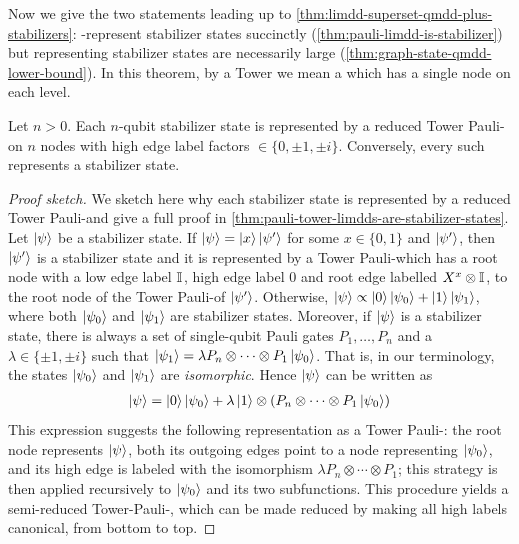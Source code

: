 Now we give the two statements leading up to \autoref{thm:limdd-superset-qmdd-plus-stabilizers}: \pauli-\limdds represent stabilizer states succinctly (\autoref{thm:pauli-limdd-is-stabilizer}) but \qmdds representing stabilizer states are necessarily large (\autoref{thm:graph-state-qmdd-lower-bound}).
In this theorem, by a Tower \limdd we mean a \limdd which has a single node on each level.

\begin{theorem}
	\label{thm:pauli-limdd-is-stabilizer}
    Let $n>0$.
    Each $n$-qubit stabilizer state is represented by a reduced Tower Pauli-\limdd on $n$ nodes with high edge label factors $\in \{0, \pm 1, \pm i\}$.
	Conversely, every such \limdd represents a stabilizer state.
\end{theorem}
\begin{proof}[Proof sketch]
    We sketch here why each stabilizer state is represented by a reduced Tower Pauli-\limdd and give a full proof in \autoref{thm:pauli-tower-limdds-are-stabilizer-states}.
    Let $\ket{\psi}$ be a stabilizer state.
    If $\ket{\psi} = \ket{x}\ket{\psi'}$ for some $x\in \{0, 1\}$ and $\ket{\psi'}$, then $\ket{\psi'}$ is a stabilizer state and it is represented by a Tower Pauli-\limdd which has a root node with a low edge label $\mathbb{I}_{}$, high edge label $0$ and root edge labelled $X^x \otimes \mathbb{I}_{}$, to the root node of the Tower Pauli-\limdd of $\ket{\psi'}$.
	Otherwise, $\ket{\psi}\propto \ket{0}\ket{\psi_0}+\ket{1}\ket{\psi_1}$, where both $\ket{\psi_0}$ and $\ket{\psi_1}$ are stabilizer states.
    Moreover, if $\ket{\psi}$ is a stabilizer state, there is always a set of single-qubit Pauli gates $P_1,\ldots, P_n$ and a $\lambda \in \{\pm 1, \pm i\}$ such that $\ket{\psi_1}=\lambda P_n\otimes\cdots\otimes P_1\ket{\psi_0}$.
	That is, in our terminology, the states $\ket{\psi_0}$ and $\ket{\psi_1}$ are \emph{isomorphic}.
	Hence $\ket{\psi}$ can be written as
	\begin{align}
		\ket{\psi}=\ket{0}\ket{\psi_0} + \lambda \ket{1}\otimes \left(P_n\otimes\cdots\otimes P_1\ket{\psi_0}\right)
	\end{align}
	This expression suggests the following representation as a Tower Pauli-\limdd: the root node represents $\ket{\psi}$, both its outgoing edges point to a node representing $\ket{\psi_0}$, and its high edge is labeled with the isomorphism $\lambda P_n\otimes\cdots\otimes P_1$; this strategy is then applied recursively to $\ket{\psi_0}$ and its two subfunctions.
    This procedure yields a semi-reduced Tower-Pauli-\limdd, which can be made reduced by making all high labels canonical, from bottom to top.
\end{proof}


